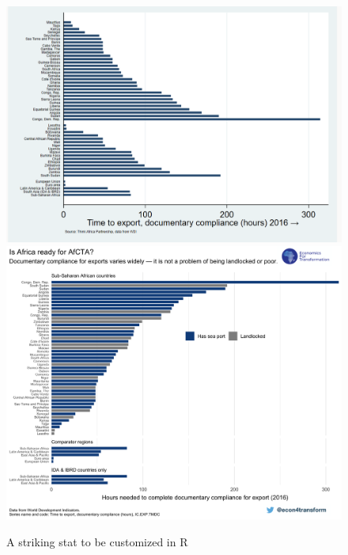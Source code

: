 \documentclass{article}
\begin{document}
\newpage
\begin{landscape}
  \begin{figure}
    \caption{A striking stat to be customized in R}
    \label{fig_stat}
 \includegraphics[width =  0.5\linewidth]{pictures/time_to_export_v1}
   \includegraphics[width =
   0.5\linewidth]{pictures/E4T_export_compliance}
  \end{figure}

\end{landscape}

\end{document}
